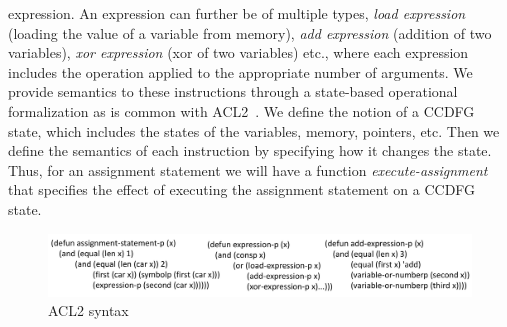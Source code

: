 expression. An expression can further be of multiple types, %
{\em load expression} (loading the value of a variable from memory), {\em add
expression} (addition of two variables), {\em xor expression} (xor of two variables)
etc., where each expression includes the operation applied to the
appropriate number of arguments. We provide semantics to these instructions through a
state-based operational formalization as is common with
ACL2~\cite{liu}. We define the notion of a CCDFG state, which includes
the states of the variables, memory, pointers, etc.  Then we
define the semantics of each instruction by specifying how
it changes the state.  Thus, for an assignment statement we
will have a function {\em execute-assignment} that specifies
the effect of executing the assignment statement on a CCDFG
state.

\begin{figure}
\begin{center}
\includegraphics[width=4.5in]{fig-proposal/formalization}
\end{center}
\caption{ACL2 syntax}
\label{fig:syntax}
\end{figure}



